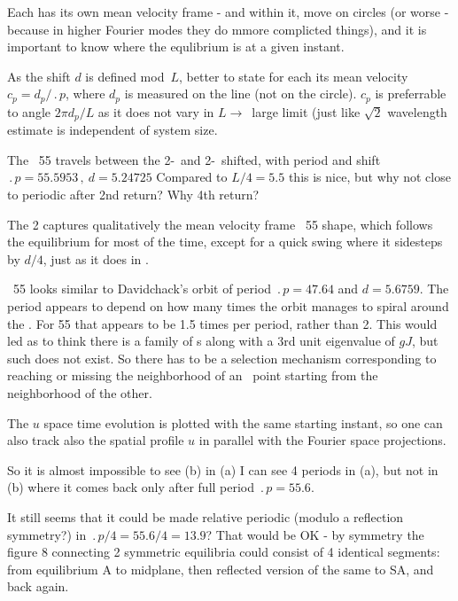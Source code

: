 Each {\rpo} has its own mean velocity frame - and within it, {\eqv}
move on circles (or worse - because in higher Fourier modes they do mmore
complicted things), and it is important to know where the equlibrium is at
a given instant.

As the shift $d$ is defined mod~$L$, better to
state for each {\rpo} its mean velocity $c_p = d_p/\period{p}$,
where $d_p$ is measured on the line (not on the circle). $c_p$ is
preferrable to angle $2\pi d_p/L$ as it does not vary in $L \to$~large 
limit (just like $\sqrt{2}$ wavelength estimate is independent of
system size.

The \rpo\ {\nameit}55 travels between the 2-\eqv\  and 
2-\eqv\ shifted,
with period and shift
$\period{p}=55.5953\,,\ d=5.24725$
Compared to $L/4 = 5.5$
this is nice, but why not close to periodic after 2nd return? Why 4th return?

The {\nameit}2 {\eqv}
captures qualitatively the mean velocity frame \rpo\ {\nameit}55 shape,
which follows the
equilibrium for most of the time, except for a quick swing where it
sidesteps by $d/4$, just as it does in . 

\Rpo\ {\nameit}55 looks similar to Davidchack's  orbit
of period 
$\period{p}=47.64$ and $d=5.6759$. The period appears to depend on how
many times the orbit manages to spiral around the \eqv.
For {\nameit}55 that appears to be
1.5 times per period, rather than 2. This would led as
to
think there is a family of \rpo s along with a 3rd unit eigenvalue of
$gJ$,
but such does not exist.
So there has to be a selection mechanism corresponding to
reaching or missing the neighborhood of an \eqv\  point starting from
the neighborhood of the other. 

The $u$ space time evolution  %
is plotted with the same starting instant,
so one can also track also the spatial profile $u$ in parallel with
the Fourier space projections.

So it is almost impossible to see (b) %
in (a) %
I can see 4 periods in (a), %
but not in (b) %
where it comes back only after full period $\period{p}=55.6$.

It still seems that it could be made relative periodic 
(modulo a reflection symmetry?)
in $\period{p}/4=55.6/4=13.9$? That would be OK 
-
by symmetry the figure 8 connecting
2 symmetric equilibria could consist of 4 identical segments: from
equilibrium A to midplane, then reflected version of the same to SA, and
back again.

